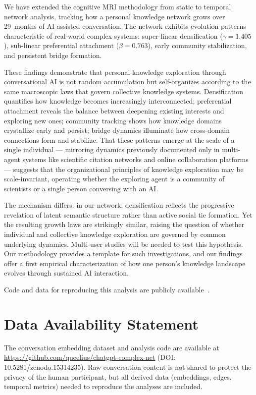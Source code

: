 \documentclass[10pt,letterpaper]{article}
\begin{document}
We have extended the cognitive MRI methodology from static to temporal network analysis, tracking how a personal knowledge network grows over 29~months of AI-assisted conversation. The network exhibits evolution patterns characteristic of real-world complex systems: super-linear densification ($\gamma = 1.405$), sub-linear preferential attachment ($\beta = 0.763$), early community stabilization, and persistent bridge formation.

These findings demonstrate that personal knowledge exploration through conversational AI is not random accumulation but self-organizes according to the same macroscopic laws that govern collective knowledge systems. Densification quantifies how knowledge becomes increasingly interconnected; preferential attachment reveals the balance between deepening existing interests and exploring new ones; community tracking shows how knowledge domains crystallize early and persist; bridge dynamics illuminate how cross-domain connections form and stabilize. That these patterns emerge at the scale of a single individual --- mirroring dynamics previously documented only in multi-agent systems like scientific citation networks and online collaboration platforms --- suggests that the organizational principles of knowledge exploration may be scale-invariant, operating whether the exploring agent is a community of scientists or a single person conversing with an AI.

The mechanism differs: in our network, densification reflects the progressive revelation of latent semantic structure rather than active social tie formation. Yet the resulting growth laws are strikingly similar, raising the question of whether individual and collective knowledge exploration are governed by common underlying dynamics. Multi-user studies will be needed to test this hypothesis. Our methodology provides a template for such investigations, and our findings offer a first empirical characterization of how one person's knowledge landscape evolves through sustained AI interaction.

Code and data for reproducing this analysis are publicly available~\citep{chatgpt-complex-net}.



\section*{Data Availability Statement}
The conversation embedding dataset and analysis code are available at \url{https://github.com/queelius/chatgpt-complex-net} (DOI: 10.5281/zenodo.15314235). Raw conversation content is not shared to protect the privacy of the human participant, but all derived data (embeddings, edges, temporal metrics) needed to reproduce the analyses are included.
\end{document}
